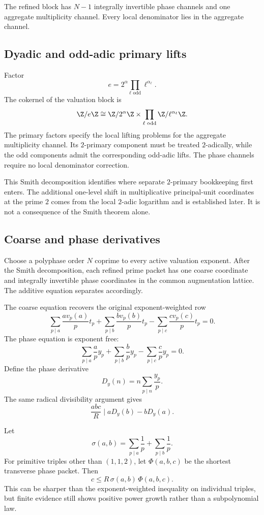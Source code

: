 The refined block has $N-1$ integrally invertible phase channels and one aggregate multiplicity channel. Every local denominator lies in the aggregate channel.

\subsection{Dyadic and odd-adic primary lifts}
Factor
\[
 e=2^\alpha\prod_{\ell\text{ odd}}\ell^{\alpha_\ell}.
\]
The cokernel of the valuation block is
\[
 \Z/e\Z
 \cong
 \Z/2^\alpha\Z
 \times
 \prod_{\ell\text{ odd}}
 \Z/\ell^{\alpha_\ell}\Z.
\]
The primary factors specify the local lifting problems for the aggregate multiplicity channel. Its $2$-primary component must be treated $2$-adically, while the odd components admit the corresponding odd-adic lifts. The phase channels require no local denominator correction.

This Smith decomposition identifies where separate $2$-primary bookkeeping first enters. The additional one-level shift in multiplicative principal-unit coordinates at the prime $2$ comes from the local $2$-adic logarithm and is established later. It is not a consequence of the Smith theorem alone.

\subsection{Coarse and phase derivatives}
Choose a polyphase order $N$ coprime to every active valuation exponent. After the Smith decomposition, each refined prime packet has one coarse coordinate and integrally invertible phase coordinates in the common augmentation lattice. The additive equation separates accordingly.

The coarse equation recovers the original exponent-weighted row
\[
 \sum_{p\mid a}\frac{av_p(a)}p t_p
 +
 \sum_{p\mid b}\frac{bv_p(b)}p t_p
 -
 \sum_{p\mid c}\frac{cv_p(c)}p t_p
 =0.
\]
The phase equation is exponent free:
\[
 \boxed{
 \sum_{p\mid a}\frac ap y_p
 +
 \sum_{p\mid b}\frac bp y_p
 -
 \sum_{p\mid c}\frac cp y_p
 =0.
 }
\]
Define the phase derivative
\[
 D_y(n)=n\sum_{p\mid n}\frac{y_p}{p}.
\]
The same radical divisibility argument gives
\[
 \frac{abc}{R}\mid aD_y(b)-bD_y(a).
\]

Let
\[
 \sigma(a,b)
 =
 \sum_{p\mid a}\frac1p
 +
 \sum_{p\mid b}\frac1p.
\]
For primitive triples other than $(1,1,2)$, let $\Phi(a,b,c)$ be the shortest transverse phase packet. Then
\[
 \boxed{
 c
 \le
 R\,\sigma(a,b)\,\Phi(a,b,c).
 }
\]
This can be sharper than the exponent-weighted inequality on individual triples, but finite evidence still shows positive power growth rather than a subpolynomial law.

